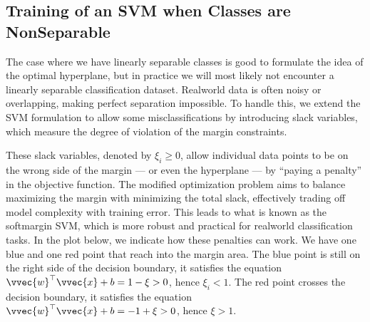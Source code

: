 \documentclass[letterpaper,10pt,english]{jupyterBook}
\begin{document}
\subsection{Training of an SVM when Classes are Non\sphinxhyphen{}Separable}
\label{\detokenize{classification_svms:training-of-an-svm-when-classes-are-non-separable}}
\sphinxAtStartPar
The case where we have linearly separable classes is good to formulate the idea of the optimal hyperplane, but in practice we will most likely not encounter a linearly separable classification dataset. Real\sphinxhyphen{}world data is often noisy or overlapping, making perfect separation impossible. To handle this, we extend the SVM formulation to allow some misclassifications by introducing slack variables, which measure the degree of violation of the margin constraints.

\sphinxAtStartPar
These slack variables, denoted by \(\xi_i\geq 0\), allow individual data points to be on the wrong side of the margin — or even the hyperplane — by “paying a penalty” in the objective function. The modified optimization problem aims to balance maximizing the margin with minimizing the total slack, effectively trading off model complexity with training error. This leads to what is known as the soft\sphinxhyphen{}margin SVM, which is more robust and practical for real\sphinxhyphen{}world classification tasks. In the plot below, we indicate how these penalties can work. We have one blue and one red point that reach into the margin area. The blue point is still on the right side of the decision boundary, it satisfies the equation \(\vvec{w}^\top\vvec{x}+b = 1-\xi> 0\), hence \(\xi_i<1\). The red point crosses the decision boundary, it satisfies the equation \(\vvec{w}^\top\vvec{x}+b = -1+\xi> 0\), hence \(\xi>1\).
\end{document}
